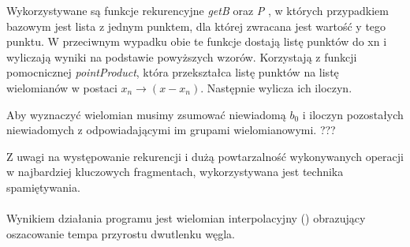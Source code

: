 \documentclass[12pt]{article}
\begin{document}
Wykorzystywane są funkcje rekurencyjne \emph{getB} oraz \emph{P} , w których przypadkiem bazowym jest lista z jednym punktem, dla której zwracana jest wartość y tego punktu. W przeciwnym wypadku obie te funkcje dostają listę punktów do xn i wyliczają wyniki na podstawie powyższych wzorów. Korzystają z funkcji pomocnicznej \emph{pointProduct}, która przekształca listę punktów na listę wielomianów w postaci $x_n \rightarrow (x-x_n)$. Następnie wylicza ich iloczyn. 

Aby wyznaczyć wielomian musimy zsumować niewiadomą $b_0$ i iloczyn pozostałych niewiadomych z odpowiadającymi im grupami wielomianowymi. ???

Z uwagi na występowanie rekurencji i dużą powtarzalność wykonywanych operacji
w najbardziej kluczowych fragmentach, wykorzystywana jest technika spamiętywania.
\\ \\
Wynikiem działania programu jest wielomian interpolacyjny () obrazujący oszacowanie tempa przyrostu dwutlenku węgla.
\end{document}
